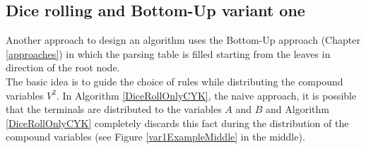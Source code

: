 \pagebreak
\clearpage
\subsection{Dice rolling and Bottom-Up variant one} \label{var1}
Another approach to design an algorithm uses the Bottom-Up approach (Chapter \ref{approaches}) in which the parsing table is filled starting from the leaves in direction of the root node.\\
The basic idea is to guide the choice of rules while distributing the compound variables $V^2$. In Algorithm \ref{DiceRollOnlyCYK}, the naive approach, it is possible that the terminals are distributed to the variables $A$ and $B$ and Algorithm \ref{DiceRollOnlyCYK} completely discards this fact during the distribution of the compound variables (see Figure \ref{var1ExampleMiddle} in the middle). \\

